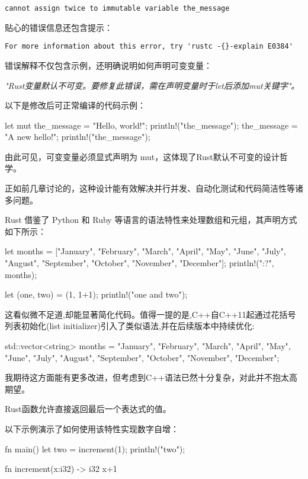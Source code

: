\verb|cannot assign twice to immutable variable the_message| 

贴心的错误信息还包含提示：

\verb|For more information about this error, try 'rustc -{}-explain E0384'|

错误解释不仅包含示例，还明确说明如何声明可变变量：

\textit{"Rust变量默认不可变。要修复此错误，需在声明变量时于let后添加mut关键字"。}

以下是修改后可正常编译的代码示例：

\begin{rust}
let mut the_message = "Hello, world!";
println!("{the_message}");
the_message = "A new hello!";
println!("{the_message}");
\end{rust}

由此可见，可变变量必须显式声明为 mut，这体现了Rust默认不可变的设计哲学。

正如前几章讨论的，这种设计能有效解决并行并发、自动化测试和代码简洁性等诸多问题。


Rust 借鉴了 Python 和 Ruby 等语言的语法特性来处理数组和元组，其声明方式如下所示：

\begin{rust}
let months = ["January", "February", "March", "April", "May", "June", "July", "August", "September", "October", "November", "December"];
println!("{:?}", months);

let (one, two) = (1, 1+1);
println!("{one} and {two}");
\end{rust}

这看似微不足道,却能显著简化代码。值得一提的是,C++自C++11起通过花括号列表初始化(list initializer)引入了类似语法,并在后续版本中持续优化:

\begin{rust}
std::vector<string> months = {"January", "February", "March", "April", "May", "June", "July", "August", "September", "October", "November", "December"};
\end{rust}

我期待这方面能有更多改进，但考虑到C++语法已然十分复杂，对此并不抱太高期望。


Rust函数允许直接返回最后一个表达式的值。

以下示例演示了如何使用该特性实现数字自增：

\begin{rust}
fn main() {
  let two = increment(1);
  println!("{two}");
}

fn increment(x:i32) -> i32{
  x+1
}
\end{rust}

